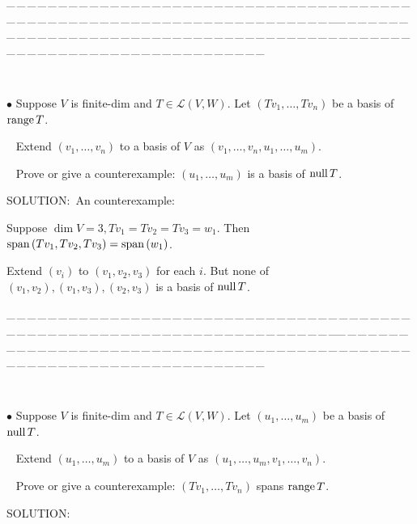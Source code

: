 \documentclass[a4paper, 11pt, UTF8]{article}
\def\range{\textup{range}\,}
\def\null{\textup{null\,}}
\def\Spn{\textup{span}\,}
\def\Lm{\mathcal{L}}
\begin{document}
\begin{large}
{\tiny \_\,\_\,\_\,\_\,\_\,\_\,\_\,\_\,\_\,\_\,\_\,\_\,\_\,\_\,\_\,\_\,\_\,\_\,\_\,\_\,\_\,\_\,\_\,\_\,\_\,\_\,\_\,\_\,\_\,\_\,\_\,\_\,\_\,\_\,\_\,\_\,\_\,\_\,\_\,\_\,\_\,\_\,\_\,\_\,\_\,\_\,\_\,\_\,\_\,\_\,\_\,\_\,\_\,\_\,\_\,\_\,\_\,\_\,\_\,\_\,\_\,\_\,\_\,\_\,\_\,\_\,\_\,\_\,\_\,\_\,\_\_\,\_\,\_\,\_\,\_\,\_\,\_\,\_\,\_\,\_\,\_\,\_\,\_\,\_\,\_\,\_\,\_\,\_\,\_\,\_\,\_\,\_\,\_\,\_\,\_\,\_\,\_\,\_\,\_\,\_\,\_\,\_\,\_\,\_\,\_\,\_\,\_\,\_\,\_\,\_\,\_\,\_\,\_\,\_\,\_\,\_\,\_\,\_\,\_\,\_\,\_\,\_\,\_\,\_\,\_\,\_\,\_\,\_\,\_\,\_\,\_\,\_\,\_\,\_\,\_\,\_\,\_\,\_\,\_\,\_\,\_}{\tiny\,\par}
{\small $\bullet$} {\timessl\Large Suppose $V$ is finite-dim and $T\in\Lm(V,W)$. Let $(Tv_1,\dots,Tv_n)$ be a basis of $\range T$.}\par\,\,\,
{\timessl\Large Extend $(v_1,\dots,v_n)$ to a basis of $V$ as $(v_1,\dots,v_n,u_1,\dots,u_m)$.}\par\,\,\,
{\timessl\Large Prove or give a counterexample: $(u_1,\dots,u_m)$ is a basis of $\null T$.}\par
{\timesbf S\footnotesize{OLUTION:}}\,\,\,An counterexample:\par\quad
Suppose $\dim V=3, Tv_1=Tv_2=Tv_3=w_1.$ Then $\Spn(Tv_1,Tv_2,Tv_3)=\Spn(w_1)$.\par\quad
Extend $(v_i)$ to $(v_1,v_2,v_3)$ for each $i$. But none of $(v_1,v_2),(v_1,v_3),(v_2,v_3)$ is a basis of $\null T$.\par
{\tiny \_\,\_\,\_\,\_\,\_\,\_\,\_\,\_\,\_\,\_\,\_\,\_\,\_\,\_\,\_\,\_\,\_\,\_\,\_\,\_\,\_\,\_\,\_\,\_\,\_\,\_\,\_\,\_\,\_\,\_\,\_\,\_\,\_\,\_\,\_\,\_\,\_\,\_\,\_\,\_\,\_\,\_\,\_\,\_\,\_\,\_\,\_\,\_\,\_\,\_\,\_\,\_\,\_\,\_\,\_\,\_\,\_\,\_\,\_\,\_\,\_\,\_\,\_\,\_\,\_\,\_\,\_\,\_\,\_\,\_\,\_\_\,\_\,\_\,\_\,\_\,\_\,\_\,\_\,\_\,\_\,\_\,\_\,\_\,\_\,\_\,\_\,\_\,\_\,\_\,\_\,\_\,\_\,\_\,\_\,\_\,\_\,\_\,\_\,\_\,\_\,\_\,\_\,\_\,\_\,\_\,\_\,\_\,\_\,\_\,\_\,\_\,\_\,\_\,\_\,\_\,\_\,\_\,\_\,\_\,\_\,\_\,\_\,\_\,\_\,\_\,\_\,\_\,\_\,\_\,\_\,\_\,\_\,\_\,\_\,\_\,\_\,\_\,\_\,\_\,\_\,\_}{\tiny\,\par}
{\small $\bullet$} {\timessl\Large Suppose $V$ is finite-dim and $T\in\Lm(V,W)$. Let $(u_1,\dots,u_m)$ be a basis of $\null T$.}\par\,\,\,
{\timessl\Large Extend $(u_1,\dots,u_m)$ to a basis of $V$ as $(u_1,\dots,u_m,v_1,\dots,v_n)$.}\par\,\,\,
{\timessl\Large Prove or give a counterexample: $(Tv_1,\dots,Tv_n)$ spans $\range T$.}\par
{\timesbf S\footnotesize{OLUTION:}}\par\quad

\end{large}
\end{document}
